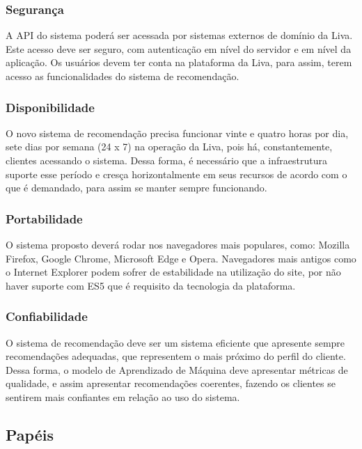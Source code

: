 \subsubsection{Segurança}

A API do sistema poderá ser acessada por sistemas externos de domínio da Liva. Este acesso deve ser seguro, com autenticação em nível do servidor e em nível da aplicação. Os usuários devem ter conta na plataforma da Liva, para assim, terem acesso as funcionalidades do sistema de recomendação.

\subsubsection{Disponibilidade}

O novo sistema de recomendação precisa funcionar vinte e quatro horas por dia, sete dias por semana (24 x 7) na operação da Liva, pois há, constantemente, clientes acessando o sistema. Dessa forma, é necessário que a infraestrutura suporte esse período e cresça horizontalmente em seus recursos de acordo com o que é demandado, para assim se manter sempre funcionando.

\subsubsection{Portabilidade}

O sistema proposto deverá rodar nos navegadores mais populares, como: Mozilla Firefox, Google Chrome, Microsoft Edge e Opera. Navegadores mais antigos como o Internet Explorer podem sofrer de estabilidade na utilização do site, por não haver suporte com ES5 que é requisito da tecnologia da plataforma.

\subsubsection{Confiabilidade}

O sistema de recomendação deve ser um sistema eficiente que apresente sempre recomendações adequadas, que representem o mais próximo do perfil do cliente. Dessa forma, o modelo de Aprendizado de Máquina deve apresentar métricas de qualidade, e assim apresentar recomendações coerentes, fazendo os clientes se sentirem mais confiantes em relação ao uso do sistema.

\subsection{Papéis}

